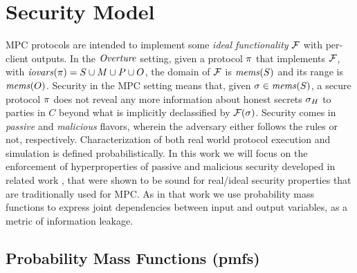 \section{Security Model}
\label{section-model}

MPC protocols are intended to implement some \emph{ideal
functionality} $\mathcal{F}$ with per-client outputs. In the $\mathit{Overture}$
setting, given a protocol $\pi$ that implements $\mathcal{F}$, with
$\mathit{iovars}(\pi) = S \cup M \cup P \cup O$, the domain of $\mathcal{F}$ is
$\mathit{mems}(S)$ and its range is $\mathit{mems}(O)$. Security in the MPC setting
means that, given $\sigma \in \mathit{mems}(S)$, a secure protocol $\pi$
does not reveal any more information about honest secrets $\sigma_H$
to parties in $C$ beyond what is implicitly declassified by
$\mathcal{F}(\sigma)$. Security comes in \emph{passive} and
\emph{malicious} flavors, wherein the adversary either follows the
rules or not, respectively. Characterization of both real world
protocol execution and simulation is defined probabilistically.  In
this work we will focus on the enforcement of hyperproperties of
passive and malicious security developed in related work
\cite{skalka-near-ppdp24}, that were shown to be sound for real/ideal
security properties that are traditionally used for MPC.  As in that
work we use probability mass functions to express joint dependencies
between input and output variables, as a metric of information
leakage.

\subsection{Probability Mass Functions (pmfs)} 

